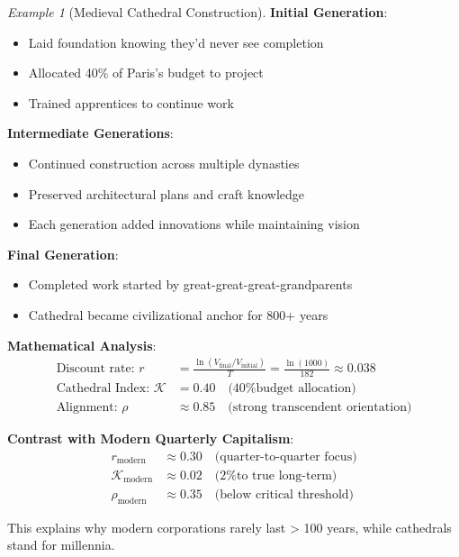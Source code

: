 \documentclass[11pt,a4paper]{article}
\theoremstyle{definition}
\theoremstyle{remark}
\newtheorem{example}{Example}[section]
\begin{document}
\begin{small}
\begin{enumerate}
\begin{example}[Medieval Cathedral Construction]
\textbf{Initial Generation}:
\begin{itemize}
    \item Laid foundation knowing they'd never see completion
    \item Allocated 40\% of Paris's budget to project
    \item Trained apprentices to continue work
\end{itemize}

\textbf{Intermediate Generations}:
\begin{itemize}
    \item Continued construction across multiple dynasties
    \item Preserved architectural plans and craft knowledge
    \item Each generation added innovations while maintaining vision
\end{itemize}

\textbf{Final Generation}:
\begin{itemize}
    \item Completed work started by great-great-great-grandparents
    \item Cathedral became civilizational anchor for 800+ years
\end{itemize}

\textbf{Mathematical Analysis}:
\begin{align}
\text{Discount rate: } r &= \frac{\ln(V_{\text{final}}/V_{\text{initial}})}{T} = \frac{\ln(1000)}{182} \approx 0.038 \\
\text{Cathedral Index: } \mathcal{K} &= 0.40 \quad \text{(40\% budget allocation)} \\
\text{Alignment: } \rho &\approx 0.85 \quad \text{(strong transcendent orientation)}
\end{align}

\textbf{Contrast with Modern Quarterly Capitalism}:
\begin{align}
r_{\text{modern}} &\approx 0.30 \quad \text{(quarter-to-quarter focus)} \\
\mathcal{K}_{\text{modern}} &\approx 0.02 \quad \text{(2\% to true long-term)} \\
\rho_{\text{modern}} &\approx 0.35 \quad \text{(below critical threshold)}
\end{align}

This explains why modern corporations rarely last > 100 years, while cathedrals stand for millennia.
\end{example}


\end{enumerate}
\end{small}
\end{document}
